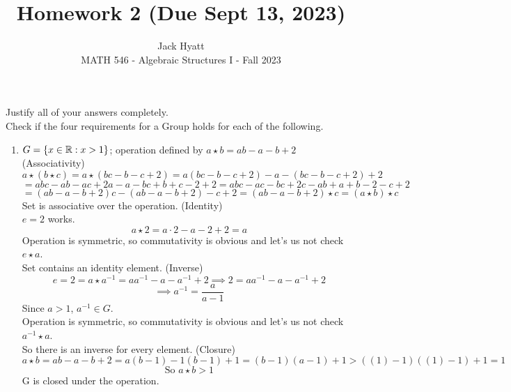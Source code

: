 \documentclass[12pt]{article}
\begin{document}
	
	
	
	\title{Homework 2 (Due Sept 13, 2023)}
	\author{Jack Hyatt\\ %
		MATH 546 - Algebraic Structures I - Fall 2023} 
	
	\maketitle
	
	Justify all of your answers completely.\\
	
	
	\medskip 
	Check if the four requirements for a Group holds for each of the following.
	\begin{enumerate}
		\item $G = \{x\in\mathbb{R} : x>1\}$; operation defined by $a \star b = ab - a - b + 2$\m
		(Associativity)\\
		\[a \star (b \star c) = a \star (bc-b-c+2) = a(bc-b-c+2)-a-(bc-b-c+2)+2\]
		\[=abc-ab-ac+2a-a-bc+b+c-2+2 = abc-ac-bc+2c -ab+a+b-2-c+2\]
		\[= (ab-a-b+2)c - (ab-a-b+2) -c+2 = (ab-a-b+2) \star c =(a \star b) \star c\]
		Set is associative over the operation.\m
		(Identity)\\
		$e = 2$ works.\\
		\[a \star 2 = a\cdot2 -a -2 +2 = a\]
		Operation is symmetric, so commutativity is obvious and let's us not check $e \star a$.\\
		Set contains an identity element.\m
		(Inverse)\\
		\[e = 2 = a \star a^{-1} = aa^{-1}-a-a^{-1}+2 \implies 2 = aa^{-1}-a-a^{-1}+2\]
		\[\implies a^{-1} = \frac{a}{a-1}\]
		Since $a>1$, $a^{-1}\in G$.\\
		Operation is symmetric, so commutativity is obvious and let's us not check $a^{-1} \star a$.\\
		So there is an inverse for every element.\m
		(Closure)\\ 
		\[a \star b = ab-a-b+2 = a(b-1) -1(b-1) +1 = (b-1)(a-1)+1 > ((1)-1)((1)-1) +1 = 1\]
		\[\text{So } a \star b > 1\]
		G is closed under the operation.\bigskip
		

\end{enumerate}
\end{document}
